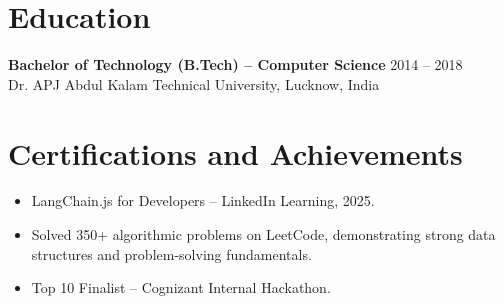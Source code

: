 \documentclass[10pt,a4paper]{article}
\begin{document}
\section*{Education}

\textbf{Bachelor of Technology (B.Tech) -- Computer Science} \hfill 2014 -- 2018 \\
Dr. APJ Abdul Kalam Technical University, Lucknow, India

\section*{Certifications and Achievements}

\begin{itemize}
    \item LangChain.js for Developers -- LinkedIn Learning, 2025.
    \item Solved 350+ algorithmic problems on LeetCode, demonstrating strong data structures and problem-solving fundamentals.
    \item Top 10 Finalist -- Cognizant Internal Hackathon.
\end{itemize}
\end{document}

